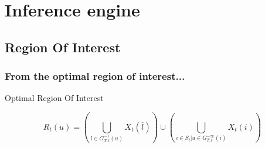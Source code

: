 \section[Engine]{Inference engine}
	\subsection[ROI]{Region Of Interest}
		\begin{frame}
			\frametitle{From the optimal region of interest...}
			\begin{block}{Optimal Region Of Interest\footnotemark[1]}

				\begin{equation}
					R_t(u)=\left(\bigcup_{l\in G_{T,t}^{-1}(u)}X_t(\overline{l})\right) \cup \left(\bigcup_{i\in S_t| u\in G_{T,t}^{-\infty}(i)}X_t(i) \right)
				\end{equation}
			\end{block}


\end{frame}
